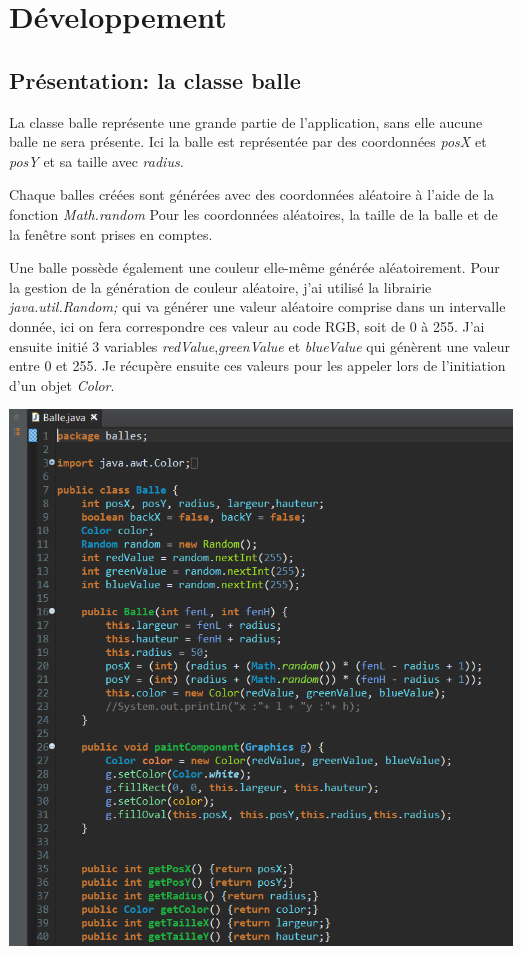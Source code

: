 \documentclass{article}
\begin{document}
\vspace{5mm}

\section{Développement}
	\subsection{Présentation: la classe balle}
La classe balle représente une grande partie de l'application, 	sans elle aucune balle ne sera présente. Ici la balle est représentée 	par des coordonnées \textit{posX} et \textit{posY} et sa taille avec \textit{radius}.  
\newline

Chaque balles créées sont générées avec des coordonnées aléatoire à l'aide de la fonction \textit{Math.random}
Pour les coordonnées aléatoires, la taille de la balle et de la fenêtre sont prises en comptes. 
\newline

Une balle possède également une couleur elle-même générée aléatoirement.
Pour la gestion de la génération de couleur aléatoire, j'ai utilisé la librairie \textit{java.util.Random;} qui va générer une valeur aléatoire comprise dans un intervalle donnée, ici on fera correspondre ces valeur au code RGB, soit de 0 à 255.
\newline
J'ai ensuite initié 3 variables \textit{redValue},\textit{greenValue} et \textit{blueValue} qui génèrent une valeur entre 0 et 255. Je récupère ensuite ces valeurs pour les appeler lors de l'initiation d'un objet \textit{Color}.
\newline 

\begin{center}
	\includegraphics[scale=0.5]{Balle.png}
\end{center}
\end{document}
